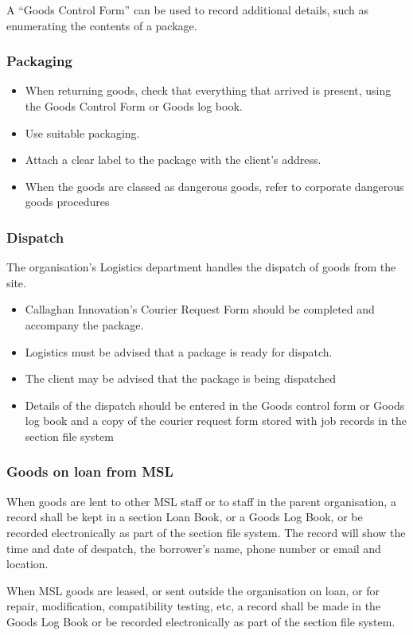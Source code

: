 A ``Goods Control Form'' can be used to record additional details, such as enumerating the contents of a package. 

\subsubsection{Packaging}
\begin{itemize}
\item When returning goods, check that everything that arrived is present, using the Goods Control Form or Goods log book.
\item Use suitable packaging.
\item Attach a clear label to the package with the client's address.
\item When the goods are classed as dangerous goods, refer to corporate dangerous goods procedures
\end{itemize}

\subsubsection{Dispatch}
The organisation’s Logistics department handles the dispatch of goods from the site.
\begin{itemize}
\item Callaghan Innovation's Courier Request Form should be completed and accompany the package.
\item Logistics must be advised that a package is ready for dispatch.
\item The client may be advised that the package is being dispatched
\item Details of the dispatch should be entered in the Goods control form or Goods log book and a copy of the courier request form stored with job records in the section file system
\end{itemize}

\subsubsection{Goods on loan from MSL}
When goods are lent to other MSL staff or to staff in the parent organisation, a record shall be kept in a section Loan Book, or a Goods Log Book, or be recorded electronically as part of the section file system. The record will show the time and date of despatch, the borrower’s name, phone number or email and location.

When MSL goods are leased, or sent outside the organisation on loan, or for repair, modification, compatibility testing, etc, a record shall be made in the Goods Log Book or be recorded electronically as part of the section file system. 